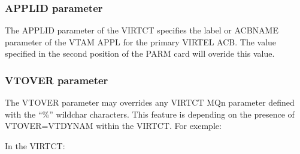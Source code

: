 \documentclass[letterpaper,10pt,english]{sphinxmanual}
\begin{document}
\ignorespaces 

\subsubsection{APPLID parameter}
\label{\detokenize{Installation_Guide:applid-parameter}}\label{\detokenize{Installation_Guide:index-12}}
\sphinxAtStartPar
The APPLID parameter of the VIRTCT specifies the label or ACBNAME parameter of the VTAM APPL for the primary
VIRTEL ACB. The value specified in the second position of the PARM card will overide this value.

\ignorespaces 

\subsubsection{VTOVER parameter}
\label{\detokenize{Installation_Guide:vtover-parameter}}\label{\detokenize{Installation_Guide:index-13}}
\sphinxAtStartPar
The VTOVER parameter may overrides any VIRTCT MQn parameter defined with the “\%” wildchar characters. This
feature is depending on the presence of VTOVER=VTDYNAM within the VIRTCT. For exemple:\sphinxhyphen{}

\sphinxAtStartPar
In the VIRTCT:
\end{document}
